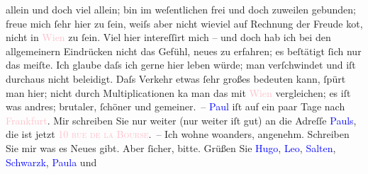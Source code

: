                allein und doch viel allein; bin im weſentlichen frei und doch zuweilen gebunden;
               freue mich ſehr hier zu ſein, weiſs aber nicht wieviel auf Rechnung der {\pb}Freude ko{\geminationm}t, nicht in \textcolor{pink}{Wien}{}\ledrightnote{\textcolor{pink}{Wien}} zu ſein. Viel hier intereſſirt mich – und doch
               hab ich bei den allgemeinern Eindrücken nicht das Gefühl, neues zu erfahren; es
               beſtätigt ſich nur das meiſte. Ich glaube daſs ich gerne hier leben würde; man
               verſchwindet und iſt durchaus nicht beleidigt. Daſs Verkehr etwas ſehr großes
               bedeuten kann, ſpürt man hier; nicht {\pb}durch
               Multiplicationen ka{\geminationn} man das mit \textcolor{pink}{Wien}{}\ledrightnote{\textcolor{pink}{Wien}} vergleichen; es iſt was andres; brutaler, ſchöner und
               gemeiner. –\pend
           \pstart
           \textcolor{blue}{Paul}{}\ledrightnote{\textcolor{blue}{Paul Goldmann}} iſt auf ein paar Tage nach \textcolor{pink}{Frankfurt}{}\ledrightnote{\textcolor{pink}{Frankfurt am Main}}. Mir schreiben Sie nur weiter (nur weiter iſt gut) an
               die Adreſſe \textcolor{blue}{Pauls}{}\ledrightnote{\textcolor{blue}{Paul Goldmann}}, die ist jetzt \textsc{\textcolor{pink}{10 rue de la Bourse}{}\ledrightnote{\textcolor{pink}{rue de la Bourse}}}. – Ich wohne woanders, angenehm. Schreiben Sie mir was es Neues gibt. Aber
               ſicher, bitte. Grüßen Sie \textcolor{blue}{Hugo}{}\ledrightnote{\textcolor{blue}{Hugo von Hofmannsthal}}, \textcolor{blue}{Leo}{}\ledrightnote{\textcolor{blue}{Leo Van-Jung}}, \textcolor{blue}{Salten}{}\ledrightnote{\textcolor{blue}{Felix Salten}}, \textcolor{blue}{Schwarzk}{}\ledrightnote{\textcolor{blue}{Gustav Schwarzkopf}}, \textcolor{blue}{Paula}{}\ledrightnote{\textcolor{blue}{Paula Beer-Hofmann}} und \label{T_L00666_1v}\label{T_L00666_1h}\pend
           \endnumbering{}  
      